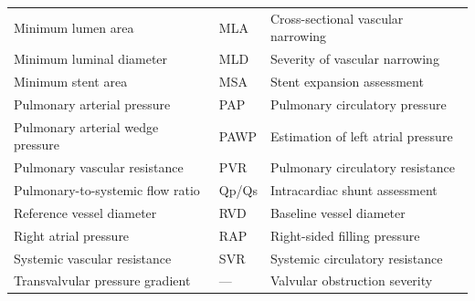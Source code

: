 \begin{longtable}{@{}p{}p{}p{}@{}}
Minimum lumen area & MLA & Cross-sectional vascular narrowing \\
Minimum luminal diameter & MLD & Severity of vascular narrowing \\
Minimum stent area & MSA & Stent expansion assessment \\
Pulmonary arterial pressure & PAP & Pulmonary circulatory pressure \\
Pulmonary arterial wedge pressure & PAWP & Estimation of left atrial pressure \\
Pulmonary vascular resistance & PVR & Pulmonary circulatory resistance \\
Pulmonary-to-systemic flow ratio & Qp/Qs & Intracardiac shunt assessment \\
Reference vessel diameter & RVD & Baseline vessel diameter \\
Right atrial pressure & RAP & Right-sided filling pressure \\
Systemic vascular resistance & SVR & Systemic circulatory resistance \\
Transvalvular pressure gradient & --- & Valvular obstruction severity \\
\bottomrule
\end{longtable}

